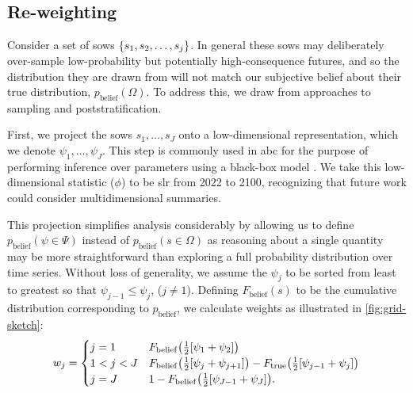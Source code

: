 \documentclass[11pt]{article}
\begin{document}
\subsection{Re-weighting}

Consider a set of \glspl{sow} $\qty{s_1, s_2, \ldots, s_j}$.
In general these \glspl{sow} may deliberately over-sample low-probability but potentially high-consequence futures, and so the distribution they are drawn from will not match our subjective belief about their true distribution, $p_\mathrm{belief}(\Omega)$.
To address this, we draw from approaches to sampling and poststratification.

First, we project the \glspl{sow} $s_1, \ldots, s_J$ onto a low-dimensional representation, which we denote $\psi_1, \ldots, \psi_J$.
This step is commonly used in \gls{abc} for the purpose of performing inference over parameters using a black-box model \citep[see][]{csillery_abc:2010}.
We take this low-dimensional statistic ($\phi$) to be \gls{slr} from 2022 to 2100, recognizing that future work could consider multidimensional summaries.

This projection simplifies analysis considerably by allowing us to define $p_\mathrm{belief}(\psi \in \Psi)$ instead of $p_\mathrm{belief}(s \in \Omega)$ as reasoning about a single quantity may be more straightforward than exploring a full probability distribution over time series.
Without loss of generality, we assume the $\psi_j$ to be sorted from least to greatest so that $\psi_{j-1} \leq \psi_j$, ($j \neq 1$).
Defining $F_\mathrm{belief}(s)$ to be the cumulative distribution corresponding to $p_\mathrm{belief}$, we calculate weights as illustrated in \cref{fig:grid-sketch}:
\begin{equation}\label{eq:weights}
    w_j = \begin{cases}
        j = 1     & F_\mathrm{belief}\qty(\frac{1}{2}\qty[\psi_1 + \psi_2])                                                                   \\
        1 < j < J & F_\mathrm{belief}\qty(\frac{1}{2}\qty[\psi_{j} + \psi_{j+1}]) - F_\mathrm{true}\qty(\frac{1}{2}\qty[\psi_{j-1} + \psi_j]) \\
        j = J     & 1 - F_\mathrm{belief}\qty(\frac{1}{2}\qty[\psi_{J-1} + \psi_J]).
    \end{cases}
\end{equation}
\end{document}
